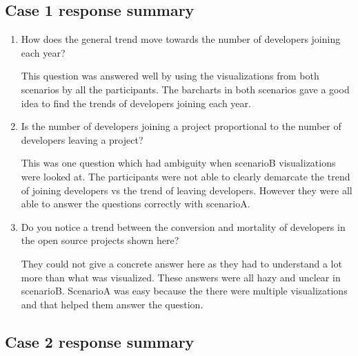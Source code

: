 \documentclass[seploa]{beavtex}
\begin{document}
\subsection{Case 1 response summary}

\begin{enumerate}
\item How does the general trend move towards the number of developers joining each year?


This question was answered well by using the visualizations from both scenarios by all the participants. The barcharts in both scenarios gave a good idea to find the trends of developers joining each year.


\item Is the number of developers joining a project proportional to the number of developers leaving a project?


This was one question which had ambiguity when scenarioB visualizations were looked at. The participants were not able to clearly demarcate the trend of joining developers vs the trend of leaving developers. However they were all able to answer the questions correctly with scenarioA.


\item Do you notice a trend between the conversion and mortality of developers in the open source projects shown here?


They could not give a concrete answer here as they had to understand a lot more than what was visualized. These answers were all hazy and unclear in scenarioB. ScenarioA was easy because the there were multiple visualizations and that helped them answer the question.
\end{enumerate}

\subsection{Case 2 response summary}
\end{document}
